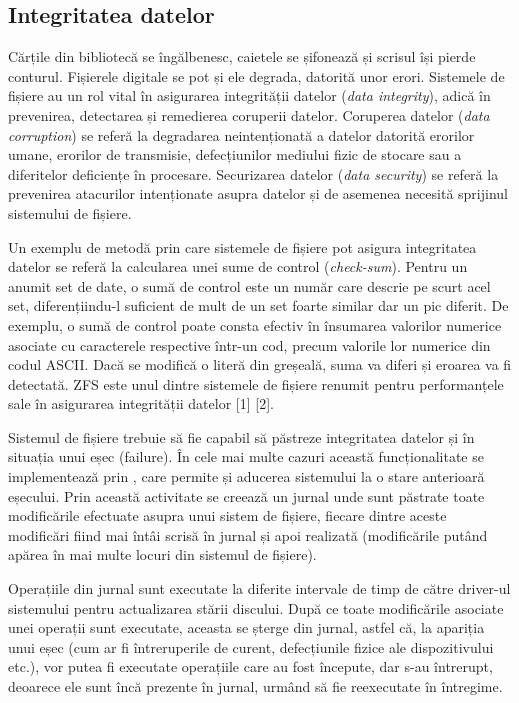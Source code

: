 \subsection{Integritatea datelor}
\label{sec:file-system-fs-integrity}

Cărțile din bibliotecă se îngălbenesc, caietele se șifonează și scrisul își
pierde conturul.  Fișierele digitale se pot și ele degrada, datorită unor erori.
Sistemele de fișiere au un rol vital în asigurarea integrității datelor
(\textit{data integrity}), adică în prevenirea, detectarea și remedierea
coruperii datelor. Coruperea datelor (\textit{data corruption}) se referă la
degradarea neintenționată a datelor datorită erorilor umane, erorilor de
transmisie, defecțiunilor mediului fizic de stocare sau a diferitelor deficiențe
în procesare. Securizarea datelor (\textit{data security}) se referă la
prevenirea atacurilor intenționate asupra datelor și de asemenea necesită
sprijinul sistemului de fișiere.

Un exemplu de metodă prin care sistemele de fișiere pot asigura integritatea
datelor se referă la calcularea unei sume de control (\textit{check-sum}).
Pentru un anumit set de date, o sumă de control este un număr care descrie pe
scurt acel set, diferențiindu-l suficient de mult de un set foarte similar dar
un pic diferit. De exemplu, o sumă de control poate consta efectiv în însumarea
valorilor numerice asociate cu caracterele respective într-un cod, precum
valorile lor numerice din codul ASCII. Dacă se modifică o literă din greșeală,
suma va diferi și eroarea va fi detectată. ZFS este unul dintre sistemele de
fișiere renumit pentru performanțele sale în asigurarea integrității datelor [1]
[2].

Sistemul de fișiere trebuie să fie capabil să păstreze integritatea datelor și
în situația unui eșec (failure). În cele mai multe cazuri această
funcționalitate se implementează prin , care permite și
aducerea sistemului la o stare anterioară eșecului. Prin această activitate se
creează un jurnal unde sunt păstrate toate modificările efectuate asupra unui
sistem de fișiere, fiecare dintre aceste modificări fiind mai întâi scrisă în
jurnal și apoi realizată (modificările putând apărea în mai multe locuri din
sistemul de fișiere).

Operațiile din jurnal sunt executate la diferite intervale de timp de către
driver-ul sistemului pentru actualizarea stării discului. După ce toate
modificările asociate unei operații sunt executate, aceasta se șterge din
jurnal, astfel că, la apariția unui eșec (cum ar fi întreruperile de curent,
defecțiunile fizice ale dispozitivului etc.), vor  putea fi executate operațiile
care au fost începute, dar s-au întrerupt, deoarece ele sunt încă prezente în
jurnal, urmând să fie reexecutate în întregime.


